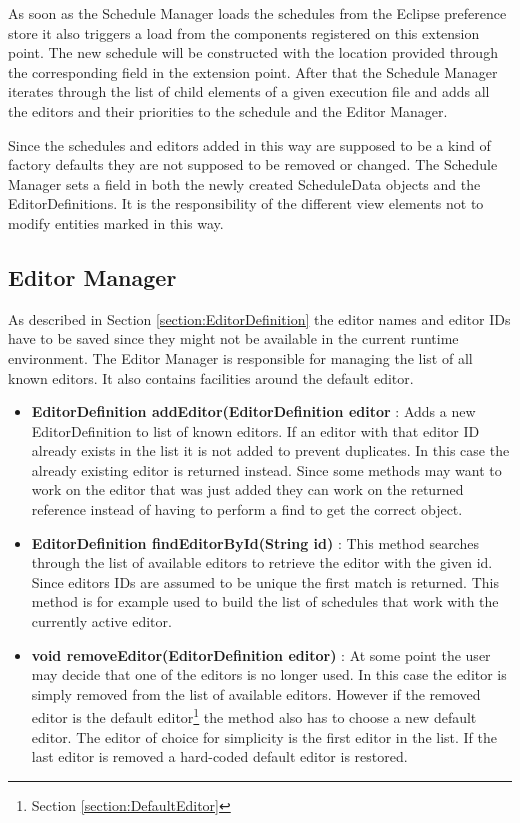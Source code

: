 As soon as the Schedule Manager loads the schedules from the Eclipse preference store it also triggers
a load from the components registered on this extension point. The new schedule will be constructed with
the location provided through the corresponding field in the extension point. After that the Schedule Manager
iterates through the list of child elements of a given execution file and adds all the editors and their
priorities to the schedule and the Editor Manager.

Since the schedules and editors added in this way are supposed to be a kind of factory defaults they are not
supposed to be removed or changed. The Schedule Manager sets a field in both the newly created ScheduleData
objects and the EditorDefinitions. It is the responsibility of the different view elements not to modify
entities marked in this way.


\subsection{Editor Manager}
\label{section:EditorManager}
As described in Section \ref{section:EditorDefinition} the editor names and editor IDs have to be saved
since they might not be available in the current runtime environment. The Editor Manager is responsible
for managing the list of all known editors. It also contains facilities around the default editor.

\begin{itemize}
 \item \textbf{EditorDefinition addEditor(EditorDefinition editor} : Adds a new EditorDefinition to list of 
known editors. If an editor with that editor ID already exists in the list it is
not added to prevent duplicates. In this case the already existing editor is returned instead. Since
some methods may want to work on the editor that was just added they can work on the returned reference
instead of having to perform a find to get the correct object.
 \item \textbf{EditorDefinition findEditorById(String id)} : This method searches through the list
of available editors to retrieve the editor with the given id. Since editors IDs are assumed to be
unique the first match is returned. This method is for example used to build the list of schedules that
work with the currently active editor.
 \item \textbf{void removeEditor(EditorDefinition editor)} : At some point the user may decide that
one of the editors is no longer used. In this case the editor is simply removed from the list of
available editors. However if the removed editor is the default editor\footnote{Section \ref{section:DefaultEditor}}
the method also has to choose a new default editor. The editor of choice for simplicity is the first
editor in the list. If the last editor is removed a hard-coded default editor is restored.
\end{itemize}

